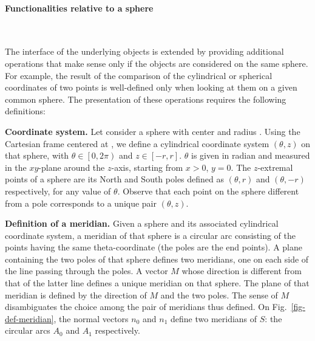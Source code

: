 {\color{cyan} %
\paragraph{Functionalities relative to a sphere}~

The interface of the underlying objects is extended by providing
additional operations that make sense only if the objects are
considered on the same sphere. For example, the result of the comparison of the
cylindrical or spherical coordinates of two points is well-defined
only when looking at them on a given common sphere. The presentation
of these operations requires the following definitions:

\textbf{Coordinate system.}
Let consider a sphere with center  and radius . Using
the Cartesian frame centered at , we define a cylindrical
coordinate system $(\theta,z)$ on that sphere, with $\theta \in \left[
  0,2\pi \right)$ and $z \in \left[ -r,r \right]$. $\theta$ is given
in radian and measured in the $xy$-plane around the $z$-axis, starting
from $x>0$, $y=0$. The $z$-extremal points of a sphere are its North
and South poles defined as $(\theta,r)$ and $(\theta,-r)$
respectively, for any value of $\theta$. Observe that each point on
the sphere different from a pole corresponds to a unique pair
$(\theta,z)$.
}%

{\color{magenta} %
\textbf{Definition of a meridian.}
Given a sphere and its associated cylindrical coordinate system, a meridian of that
sphere is a circular arc consisting of the points having the same theta-coordinate
(the poles are the end points).
A plane containing the two poles of that sphere defines two meridians, one on each side
of the line passing through the poles. A vector $M$ whose direction is different from that of the latter
line defines a unique meridian on that sphere. The plane of that meridian is defined by the
direction of $M$ and the two poles. The sense of $M$ disambiguates the choice among the
pair of meridians thus defined.
On Fig.~\ref{fig-def-meridian}, the normal vectors $n_0$ and $n_1$ define 
two meridians of $S$: the circular arcs $A_0$ and $A_1$ respectively.
}%

